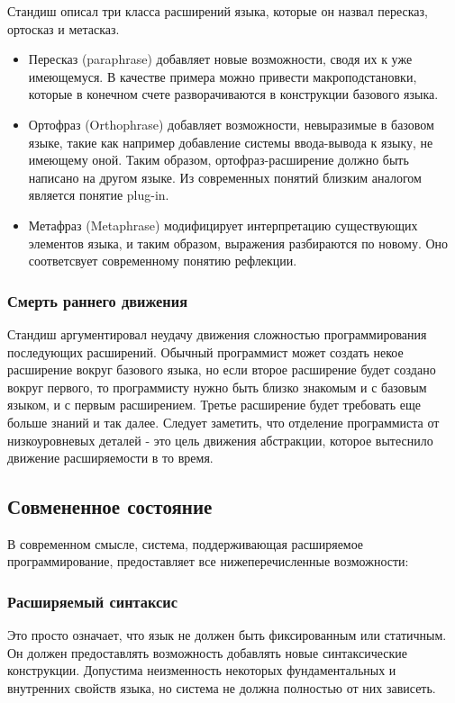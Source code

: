 \documentclass[a4paper,12pt]{article}
\begin{document}
Стандиш описал три класса расширений языка, которые он назвал пересказ,
ортосказ и метасказ.
\begin{itemize}
  \item Пересказ (paraphrase) добавляет новые возможности, сводя их к уже
  имеющемуся. В качестве примера можно привести макроподстановки, которые в
  конечном счете разворачиваются в конструкции базового языка.
  \item Ортофраз (Orthophrase) добавляет возможности, невыразимые в базовом
  языке, такие как например добавление системы ввода-вывода к языку, не имеющему оной. Таким
  образом, ортофраз-расширение должно быть написано на другом языке. Из
  современных понятий близким аналогом является понятие plug-in.
  \item Метафраз (Metaphrase) модифицирует интерпретацию существующих элементов
  языка, и таким образом, выражения разбираются по новому. Оно соответсвует современному
  понятию рефлекции.
\end{itemize}

\subsubsection{Смерть раннего движения}

Стандиш аргументировал неудачу движения сложностью программирования последующих
расширений. Обычный программист может создать некое расширение вокруг базового
языка, но если второе расширение будет создано вокруг первого, то программисту
нужно быть близко знакомым и с базовым языком, и с первым расширением. Третье
расширение будет требовать еще больше знаний и так далее. Следует заметить, что
отделение программиста от низкоуровневых деталей - это цель движения
абстракции, которое вытеснило движение расширяемости в то время.

\subsection{Совмененное состояние}

В современном смысле, система, поддерживающая расширяемое программирование,
предоставляет все нижеперечисленные возможности:

\subsubsection{Расширяемый синтаксис}

Это просто означает, что язык не должен быть фиксированным или статичным. Он
должен предоставлять возможность добавлять новые синтаксические конструкции.
Допустима неизменность некоторых фундаментальных и внутренних свойств языка, но
система не должна полностью от них зависеть.
\end{document}
